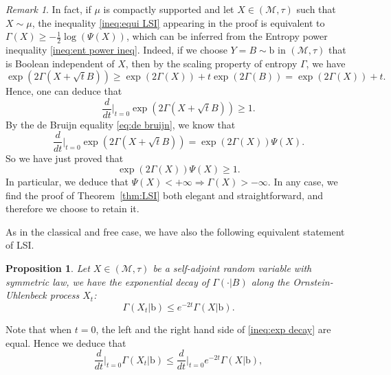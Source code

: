 \documentclass[10pt, reqno]{amsart}
\numberwithin{equation}{section}
\theoremstyle{definition}
\theoremstyle{plain}
\newtheorem{proposition}[definition]{Proposition}
\theoremstyle{remark}
\newtheorem{remark}[definition]{Remark}
\newcommand{\1}{\mathbbm{1}}
\begin{document}
	\begin{remark}
		In fact, if $\mu$ is compactly supported and let $X\in(\mathcal{M},\tau)$ such that $X\sim \mu$, the inequality \eqref{ineq:equi LSI} appearing in the proof is equivalent to $\Gamma(X) \geq -\frac{1}{2} \log \left(\Psi(X)\right)$,
		which can be inferred from the Entropy power inequality \eqref{ineq:ent power ineq}.
        Indeed, if we choose $Y=B\sim \mathbb{\mathrm{b}}$ in $(\mathcal{M},\tau)$ that is Boolean independent of $X$, then by the scaling property of entropy $\Gamma$, we have
	\begin{equation*}
		\exp(2\Gamma(X+\sqrt{t}B))\ge \exp(2\Gamma(X)) + t\exp(2\Gamma(B)) = \exp(2\Gamma(X))  + t.
	\end{equation*}
	Hence, one can deduce that
	\begin{equation*}
		\frac{d}{dt}\Big|_{t=0} \exp(2\Gamma(X+\sqrt{t}B)) \ge 1.
	\end{equation*}
	By the de Bruijn equality \eqref{eq:de bruijn}, we know that
	\begin{equation*}
		\frac{d}{dt}\Big|_{t=0} \exp(2\Gamma(X+\sqrt{t}B)) = \exp(2\Gamma(X))\Psi(X).
	\end{equation*}
	So we have just proved that
	\begin{equation}
	    \exp(2\Gamma(X))\Psi(X)\ge 1.
	\end{equation}
        In particular, we deduce that $\Psi(X)<+\infty \Rightarrow \Gamma(X)>-\infty$. In any case, we find the proof of Theorem~\ref{thm:LSI} both elegant and straightforward, and therefore we choose to retain it.
	\end{remark}
	As in the classical and free case, we have also the following equivalent statement of LSI.
	\begin{proposition}
            Let $X\in(\mathcal{M},\tau)$ be a self-adjoint random variable with symmetric law, we have the exponential decay of $\Gamma(\cdot|B)$ along the Ornstein-Uhlenbeck process $X_t$:
            \begin{equation}\label{ineq:exp decay}
                \Gamma(X_t| \mathbb{\mathrm{b}})\le e^{-2t} \Gamma(X| \mathbb{\mathrm{b}}).
			\end{equation}
	\end{proposition}
    Note that when $t=0$, the left and the right hand side of \eqref{ineq:exp decay} are equal. Hence we deduce that 
		\begin{equation*}
			\frac{d}{dt}\Big|_{t=0} \Gamma(X_t| \mathbb{\mathrm{b}})\le \frac{d}{dt}\Big|_{t=0} e^{-2t} \Gamma(X| \mathbb{\mathrm{b}}),
		\end{equation*}
\end{document}
